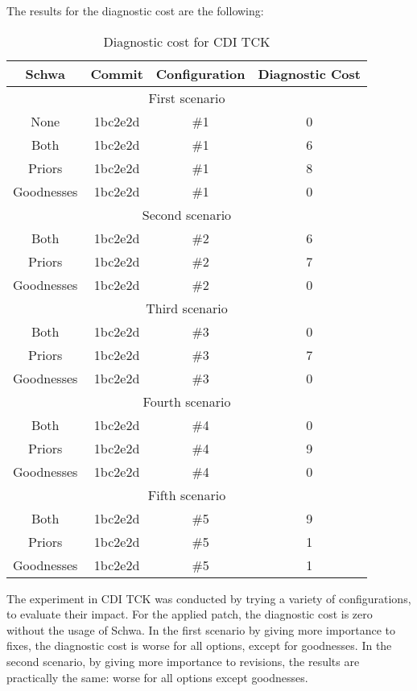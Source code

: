 The results for the diagnostic cost are the following:
\begin{table}[H]
    \centering
    \caption{Diagnostic cost for CDI TCK}
    \label{table:cd_cditck}
    \begin{tabular}{|c|c|c|c|}
        \hline
        Schwa & Commit & Configuration & Diagnostic Cost \\ \hline
        \multicolumn{4}{|c|}{First scenario} \\ \hline
        None & 1bc2e2d & \#1 & 0 \\ \hline
        Both & 1bc2e2d & \#1 & 6 \\ \hline
        Priors & 1bc2e2d & \#1 & 8 \\ \hline
        Goodnesses & 1bc2e2d & \#1 & 0 \\ \hline
        
        \multicolumn{4}{|c|}{Second scenario} \\ \hline
        Both & 1bc2e2d & \#2 & 6 \\ \hline
        Priors & 1bc2e2d & \#2 & 7 \\ \hline
        Goodnesses & 1bc2e2d & \#2 & 0 \\ \hline
        
        \multicolumn{4}{|c|}{Third scenario} \\ \hline
        Both & 1bc2e2d & \#3 & 0 \\ \hline
        Priors & 1bc2e2d & \#3 & 7 \\ \hline
        Goodnesses & 1bc2e2d & \#3 & 0 \\ \hline
        
        \multicolumn{4}{|c|}{Fourth scenario} \\ \hline
        Both & 1bc2e2d & \#4 & 0 \\ \hline
        Priors & 1bc2e2d & \#4 & 9 \\ \hline
        Goodnesses & 1bc2e2d & \#4 & 0 \\ \hline

        \multicolumn{4}{|c|}{Fifth scenario} \\ \hline
        Both & 1bc2e2d & \#5 & 9 \\ \hline
        Priors & 1bc2e2d & \#5 & 1 \\ \hline
        Goodnesses & 1bc2e2d & \#5 & 1 \\ \hline
    \end{tabular}
\end{table}

The experiment in CDI TCK was conducted by trying a variety of configurations, to evaluate their impact. For the applied patch, the diagnostic cost is zero without the usage of Schwa. In the first scenario by giving more importance to fixes, the diagnostic cost is worse for all options, except for goodnesses. In the second scenario, by giving more importance to revisions, the results are practically the same: worse for all options except goodnesses. 

